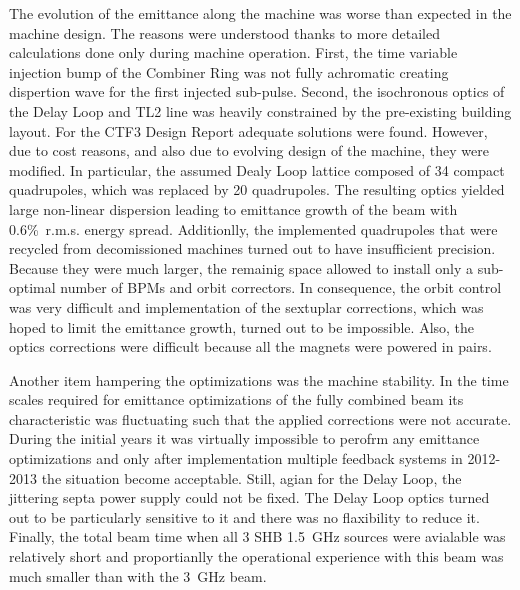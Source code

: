 The evolution of the emittance along the machine was worse than expected in the machine design.
The reasons were understood thanks to more detailed calculations done only during machine operation.
First, the time variable injection bump of the Combiner Ring was not fully achromatic 
creating dispertion wave for the first injected sub-pulse.
Second, the isochronous optics of the Delay Loop and TL2 line was heavily constrained by 
the pre-existing building layout.
For the CTF3 Design Report adequate solutions were found. However, due to cost reasons,
and also due to evolving design of the machine, they were modified.
In particular, the assumed Dealy Loop lattice composed of 34 compact quadrupoles, 
which was replaced by 20 quadrupoles. 
The resulting optics yielded large non-linear dispersion leading to emittance growth 
of the beam with 0.6\%~r.m.s. energy spread. 
Additionlly, the implemented quadrupoles that were recycled from decomissioned machines
turned out to have insufficient precision. 
Because they were much larger, the remainig space allowed to install only a sub-optimal number of BPMs and orbit correctors. 
In consequence, the orbit control was very difficult and implementation of the sextuplar corrections,
which was hoped to limit the emittance growth, turned out to be impossible.
Also, the optics corrections were difficult because all the magnets were powered in pairs.

Another item hampering the optimizations was the machine stability. 
In the time scales required for emittance optimizations of the fully combined beam 
its characteristic was fluctuating 
such that the applied corrections were not accurate.
During the initial years it was virtually impossible to perofrm any emittance optimizations 
and only after implementation multiple feedback systems in 2012-2013 the situation become acceptable.
Still, agian for the Delay Loop, the jittering septa power supply could not be fixed.
The Delay Loop optics turned out to be particularly sensitive to it and 
there was no flaxibility to reduce it. 
Finally, the total beam time when all 3 SHB 1.5~GHz sources were avialable was relatively short
and proportianlly the operational experience with this beam was much smaller than with the 3~GHz beam. 



